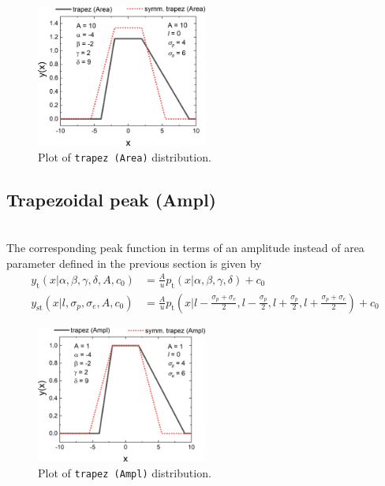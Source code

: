 \begin{figure}[htb]
\begin{center}
\includegraphics[width=0.5\textwidth]{../images/peaks/trapez/trapezArea.png}
\end{center}
\caption{Plot of \texttt{trapez (Area)} distribution.}
\label{fig:trapezArea}
\end{figure}

\subsection{Trapezoidal peak (Ampl)} ~\\
\label{sec:trapezoidalAmpl}
The corresponding peak function in terms of an amplitude instead of area parameter defined in the previous section is given by
\begin{align}\label{eq:trapezoidalpeakAmpl}
y_\mathrm{t}(x|\alpha,\beta,\gamma,\delta,A,c_0) &= \frac{A}{u}\textstyle p_\mathrm{t}(x|\alpha,\beta,\gamma,\delta) +c_0 \\
y_\mathrm{st}(x|l,\sigma_p,\sigma_e,A,c_0) &= \frac{A}{u} \textstyle p_\mathrm{t}\left(x|l-\frac{\sigma_p+\sigma_e}{2},l-\frac{\sigma_p}{2},l+\frac{\sigma_p}{2},l+\frac{\sigma_p+\sigma_e}{2}\right) +c_0
\end{align}

\begin{figure}[htb]
\begin{center}
\includegraphics[width=0.5\textwidth]{../images/peaks/trapez/trapezAmpl.png}
\end{center}
\caption{Plot of \texttt{trapez (Ampl)} distribution.}
\label{fig:trapezAmpl}
\end{figure}

